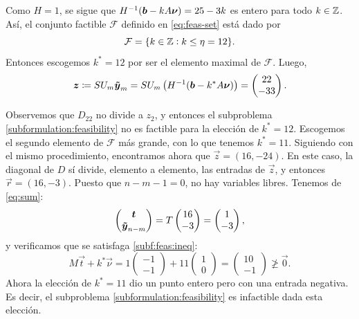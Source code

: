 \begin{example}
	Como $H = 1$, se sigue que $H^{-1} (\boldsymbol{b} - kA\boldsymbol{\nu}) = 25 - 3k$ es entero para todo $k
	\in \mathbb{Z}$. Así, el conjunto factible $\mathcal{F}$ definido en \ref{eq:feas-set} está dado por
	\begin{equation*}
		\mathcal{F} 
		= \lbrace k \in \mathbb{Z} \vcentcolon k \leq \eta = 12 \rbrace.
	\end{equation*}
	Entonces escogemos $k^* = 12$ por ser el elemento maximal de $\mathcal{F}$. Luego,
	\begin{equation*}
		\boldsymbol{z} \coloneq SU_m\boldsymbol{\tilde{y}}_m = SU_m \left(H^{-1} (\boldsymbol{b} - k^*A\boldsymbol{\nu})\right)
		= \begin{pmatrix} 22 \\ -33 \end{pmatrix}.
	\end{equation*}

	Observemos que $D_{22}$ no divide a $z_2$, y entonces el subproblema \eqref{subformulation:feasibility}
	no es factible para la elección de $k^* = 12$. Escogemos el segundo elemento de $\mathcal{F}$
	más grande, con lo que tenemos $k^* = 11$. Siguiendo con el mismo procedimiento, encontramos
	ahora que $\vec{z} = (16, -24)$. En este caso, la diagonal de $D$ sí divide, elemento a elemento,
	las entradas de $\vec{z}$, y entonces $\vec{r} = (16, -3)$. Puesto que $n - m - 1 = 0$, no hay
	variables libres. Tenemos de \eqref{eq:sum}:
	\begin{equation*}
		\begin{pmatrix} \boldsymbol{t} \\ \boldsymbol{\tilde{y}}_{n-m} \end{pmatrix} = T
		\begin{pmatrix} 16 \\ -3 \end{pmatrix} = \begin{pmatrix} 1 \\ -3 \end{pmatrix},
	\end{equation*}
	y verificamos que se satisfaga \eqref{subf:feas:ineq}:
	\begin{equation*}
		M\vec{t} + k^*\vec{\nu}
		= 1 \begin{pmatrix} -1 \\ -1 \end{pmatrix} + 11 \begin{pmatrix} 1 \\ 0 \end{pmatrix}
		= \begin{pmatrix} 10 \\ -1 \end{pmatrix} \not \geq \vec{0}.
	\end{equation*}
	Ahora la elección de $k^* = 11$ dio un punto entero pero con una entrada negativa. Es decir, el
	subproblema \eqref{subformulation:feasibility} es infactible dada esta elección.


\end{example}
